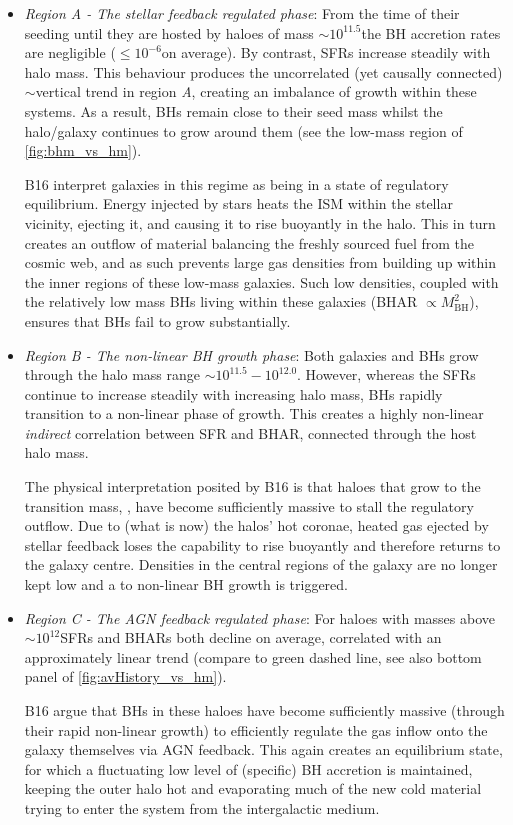 \begin{itemize}

\item \emph{Region A - The stellar feedback regulated phase}: From the time of
their seeding until they are hosted by haloes of mass  $\sim
10^{11.5}$\Msol the BH accretion rates are negligible (\BHAR $\leq
10^{-6}$\Msolyr on average).  By contrast, SFRs increase steadily with halo
mass. This behaviour produces the uncorrelated (yet causally connected)
$\sim$vertical trend in region \emph{A}, creating an imbalance of growth within
these systems. As a result, BHs remain close to their seed mass whilst the
halo/galaxy continues to grow around them (see the low-mass region of
\cref{fig:bhm_vs_hm}).

B16 interpret galaxies in this regime as being in a state of regulatory
equilibrium. Energy injected by stars heats the ISM within the stellar vicinity,
ejecting it, and causing it to rise buoyantly in the halo. This in turn creates
an outflow of material balancing the freshly sourced fuel from the cosmic web,
and as such prevents large gas densities from building up within the inner
regions of these low-mass galaxies.  Such low densities, coupled with the
relatively low mass BHs living within these galaxies (BHAR $\propto
M_{\mathrm{BH}}^{2}$), ensures that BHs fail to grow substantially. 

\item \emph{Region B - The non-linear BH growth phase}: Both galaxies and BHs
grow through the halo mass range  $\sim 10^{11.5} - 10^{12.0}$\Msol.
However, whereas the SFRs continue to increase steadily with increasing halo
mass, BHs rapidly transition to a non-linear phase of growth. This creates a
highly non-linear \textit{indirect} correlation between SFR and BHAR, connected
through the host halo mass.  

The physical interpretation posited by B16 is that haloes that grow to the
transition mass, , have become sufficiently massive to stall the
regulatory outflow. Due to (what is now) the halos' hot coronae, heated gas
ejected by stellar feedback loses the capability to rise buoyantly and
therefore returns to the galaxy centre.  Densities in the central regions of
the galaxy are no longer kept low and a  to non-linear BH
growth is triggered.  

\item \emph{Region C - The AGN feedback regulated phase}: For haloes with
masses above  $\sim 10^{12}$\Msol SFRs and BHARs both decline on
average, correlated with an approximately linear trend (compare to green dashed
line, see also bottom panel of \cref{fig:avHistory_vs_hm}). 

B16 argue that BHs in these haloes have become sufficiently massive (through
their rapid non-linear growth) to efficiently regulate the gas inflow onto the
galaxy themselves via AGN feedback.  This again creates an equilibrium state,
for which a fluctuating low level of (specific) BH accretion is maintained,
keeping the outer halo hot and evaporating much of the new cold material trying
to enter the system from the intergalactic medium.

\end{itemize}

